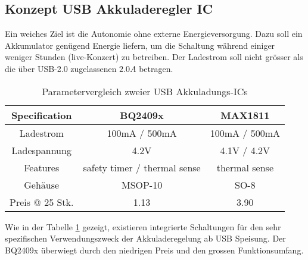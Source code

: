 \subsection{Konzept USB Akkuladeregler IC}
\label{sec:Konzept_Charger}

Ein weiches Ziel ist die Autonomie ohne externe Energieversorgung. 
Dazu soll ein Akkumulator genügend Energie liefern, um die Schaltung während einiger weniger Stunden (live-Konzert) zu betreiben. 
Der Ladestrom soll nicht grösser als die über USB-2.0 zugelassenen $2.0\si{A}$ betragen.

\begin{table}[H]
	\centering
	\begin{tabular}{|c|c|c|}
		\hline
		\textbf{Specification} & \textbf{BQ2409x}             & \textbf{MAX1811} \\ \hline
		Ladestrom              & 100mA / 500mA                & 100mA / 500mA    \\ \hline
		Ladespannung           & 4.2V                         & 4.1V / 4.2V      \\ \hline
		Features               & safety timer / thermal sense & thermal sense    \\ \hline
		Gehäuse                & MSOP-10                      & SO-8             \\ \hline
		Preis @ 25 Stk.        & 1.13                         & 3.90             \\ \hline
	\end{tabular}
	\caption{Parametervergleich zweier USB Akkuladungs-ICs}
	\label{tab:ComparisonCharger}
\end{table}

Wie in der Tabelle \ref{tab:ComparisonCharger} gezeigt, existieren integrierte Schaltungen für den sehr spezifischen Verwendungszweck der Akkuladeregelung ab USB Speisung.
Der BQ2409x überwiegt durch den niedrigen Preis und den grossen Funktionsumfang.
